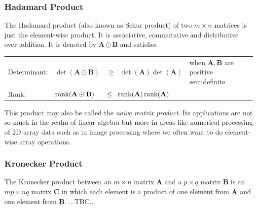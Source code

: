 \subsubsection{Hadamard Product} The Hadamard product (also known as Schur product) of two $m \times n$ matrices is just the element-wise product. It is associative, commutative and distributive over addition. It is denoted by $\mathbf{A} \odot \mathbf{B}$ and satisfies

\medskip
\begin{tabular}{l l l l}
Determinant: & $\det(\mathbf{A} \odot \mathbf{B})$ 
             & $\geq \;\; \det(\mathbf{A})  \det(\mathbf{A})$   
             & when $\mathbf{A,B}$ are positive semidefinite \\
Rank:        & $\operatorname{rank}(\mathbf{A} \odot \mathbf{B}) $
             & $\leq \;\; \operatorname{rank}(\mathbf{A}) \operatorname{rank}(\mathbf{A})$     \\
\end{tabular}
\medskip

This product may also be called the \emph{naive matrix product}. Its applications are not so much in the realm of linear algebra but more in areas like numerical processing of 2D array data such as in image processing where we often want to do element-wise array operations. 




\subsubsection{Kronecker Product} The Kronecker product between an $m \times n$ matrix $\mathbf{A}$ and a $p \times q$ matrix $\mathbf{B}$ is an $mp \times nq$ matrix $\mathbf{C}$ in which each element is a product of one element from $\mathbf{A}$ and one element from $\mathbf{B}$. ...TBC..



